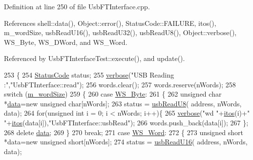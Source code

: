 Definition at line 250 of file Usb\+F\+T\+Interface.\+cpp.



References shell\+::data(), Object\+::error(), Status\+Code\+::\+F\+A\+I\+L\+U\+RE, itos(), m\+\_\+word\+Size, usb\+Read\+U16(), usb\+Read\+U32(), usb\+Read\+U8(), Object\+::verbose(), W\+S\+\_\+\+Byte, W\+S\+\_\+\+D\+Word, and W\+S\+\_\+\+Word.



Referenced by Usb\+F\+T\+Interface\+Test\+::execute(), and update().


\begin{DoxyCode}
253 \{
254   \hyperlink{classStatusCode}{StatusCode} status;
255   \hyperlink{classObject_a83d2db2df682907ea1115ad721c1c4a1}{verbose}(\textcolor{stringliteral}{"USB Reading :"},\textcolor{stringliteral}{"UsbFTInterface::read"});
256   words.clear();
257   words.reserve(nWords);
258   \textcolor{keywordflow}{switch} (\hyperlink{classUsbFTInterface_a05ccc38a60c4b921b835238b604b38d8}{m\_wordSize})
259   \{
260   \textcolor{keywordflow}{case} \hyperlink{classUsbFTInterface_a057387f452eaac094fb77ba09cf1cf2ea32efe2feb6728578134aa9b85b97d1b9}{WS\_Byte}:
261     \{
262       \textcolor{keywordtype}{unsigned} \textcolor{keywordtype}{char} *\hyperlink{namespaceshell_a5ea2525995cedc3efd69ea8a7f034d1e}{data}=\textcolor{keyword}{new} \textcolor{keywordtype}{unsigned} \textcolor{keywordtype}{char}[nWords];
263       status = \hyperlink{classUsbFTInterface_ab0803dd4c3ce3bf26dff4f4145b34546}{usbReadU8}( address, nWords, data);
264       \textcolor{keywordflow}{for}(\textcolor{keywordtype}{unsigned} \textcolor{keywordtype}{int} i = 0; i < nWords; i++)\{
265         \hyperlink{classObject_a83d2db2df682907ea1115ad721c1c4a1}{verbose}(\textcolor{stringliteral}{"wd "}+\hyperlink{Tools_8h_af330027dbdafb9a30768b3613c553e60}{itos}(i)+\textcolor{stringliteral}{" "}+\hyperlink{Tools_8h_af330027dbdafb9a30768b3613c553e60}{itos}(data[i]),\textcolor{stringliteral}{"UsbFTInterface::usbRead"});
266         words.push\_back(data[i]);
267       \};
268       \textcolor{keyword}{delete} \hyperlink{namespaceshell_a5ea2525995cedc3efd69ea8a7f034d1e}{data};
269     \}
270     \textcolor{keywordflow}{break};
271   \textcolor{keywordflow}{case} \hyperlink{classUsbFTInterface_a057387f452eaac094fb77ba09cf1cf2ea83a39aef091bbcfb420ac32aafe55e0a}{WS\_Word}:
272     \{
273       \textcolor{keywordtype}{unsigned} \textcolor{keywordtype}{short} *data=\textcolor{keyword}{new} \textcolor{keywordtype}{unsigned} \textcolor{keywordtype}{short}[nWords];
274       status = \hyperlink{classUsbFTInterface_ae17381a2ca14b9acac9faa10c3e430db}{usbReadU16}( address, nWords, data);

\end{DoxyCode}
